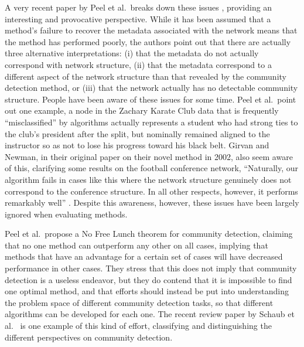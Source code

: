 A very recent paper by Peel et al.~breaks down these issues
\autocite{peel_ground_2017}, providing an interesting and provocative
perspective. While it has been assumed that a method's failure to
recover the metadata associated with the network means that the method
has performed poorly, the authors point out that there are actually
three alternative interpretations: (i) that the metadata do not actually
correspond with network structure, (ii) that the metadata correspond to
a different aspect of the network structure than that revealed by the
community detection method, or (iii) that the network actually has no
detectable community structure. People have been aware of these issues
for some time. Peel et al.~point out one example, a node in the Zachary
Karate Club data that is frequently ``misclassified'' by algorithms
actually represents a student who had strong ties to the club's
president after the split, but nominally remained aligned to the
instructor so as not to lose his progress toward his black belt. Girvan
and Newman, in their original paper on their novel method in 2002, also
seem aware of this, clarifying some results on the football conference
network, ``Naturally, our algorithm fails in cases like this where the
network structure genuinely does not correspond to the conference
structure. In all other respects, however, it performs remarkably well''
\autocite{girvan_community_2002}. Despite this awareness, however, these
issues have been largely ignored when evaluating methods.

Peel et al.~propose a No Free Lunch theorem for community detection,
claiming that no one method can outperform any other on all cases,
implying that methods that have an advantage for a certain set of cases
will have decreased performance in other cases. They stress that this
does not imply that community detection is a useless endeavor, but they
do contend that it is impossible to find one optimal method, and that
efforts should instead be put into understanding the problem space of
different community detection tasks, so that different algorithms can be
developed for each one. The recent review paper by Schaub et
al.~\autocite{schaub_many_2017} is one example of this kind of effort,
classifying and distinguishing the different perspectives on community
detection.

